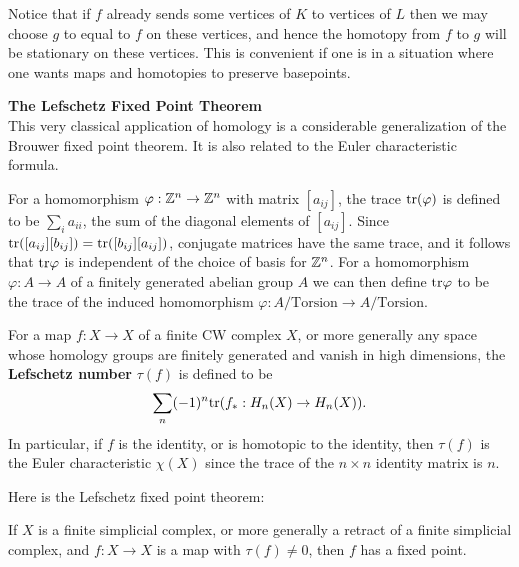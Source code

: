 Notice that if $f$ already sends some vertices of $K$ to vertices of $L$ then we may choose $g$ to equal to $f$ on these vertices, and hence the homotopy from $f$ to $g$ will be stationary on these vertices. This is convenient if one is in a situation where one wants maps and homotopies to preserve basepoints.\par
\textbf{The Lefschetz Fixed Point Theorem}\\
This very classical application of homology is a considerable generalization of the Brouwer fixed point theorem. It is also related to the Euler characteristic formula.\par 
For a homomorphism $\varphi:\mathbb{Z}^n\to\mathbb{Z}^n$ with matrix $[a_{ij}]$, the trace $\mathrm{tr}(\varphi)$ is defined to be $\sum_ia_{ii}$, the sum of the diagonal elements of $[a_{ij}]$. 
Since $\mathrm{tr}([a_{ij}][b_{ij}])=\mathrm{tr}([b_{ij}][a_{ij}])$, conjugate matrices have the same trace, and it follows that $\mathrm{tr}\varphi$ is independent of the choice of basis for 
$\mathbb{Z}^n$. For a homomorphism $\varphi:A\to A$ of a finitely generated abelian group $A$ we can then define $\mathrm{tr}\varphi$ to be the trace of the induced homomorphism 
$\varphi:A/\text{Torsion}\to A/\text{Torsion}$.\par
For a map $f:X\to X$ of a finite CW complex $X$, or more generally any space whose homology groups are finitely generated and vanish in high dimensions, the \textbf{Lefschetz number} $\tau(f)$ is defined to be
\[\sum_n(-1)^n\mathrm{tr}(f_*:H_n(X)\to H_n(X)).\]
In particular, if $f$ is the identity, or is homotopic to the identity, then $\tau(f)$ is the Euler characteristic $\chi(X)$ since the trace of the $n\times n$ identity matrix is $n$.\par 
Here is the Lefschetz fixed point theorem:
\begin{theorem}
If $X$ is a finite simplicial complex, or more generally a retract of a finite simplicial complex, and $f:X\to X$ is a map with $\tau(f)\neq0$, then $f$ has a fixed point.
\end{theorem}
